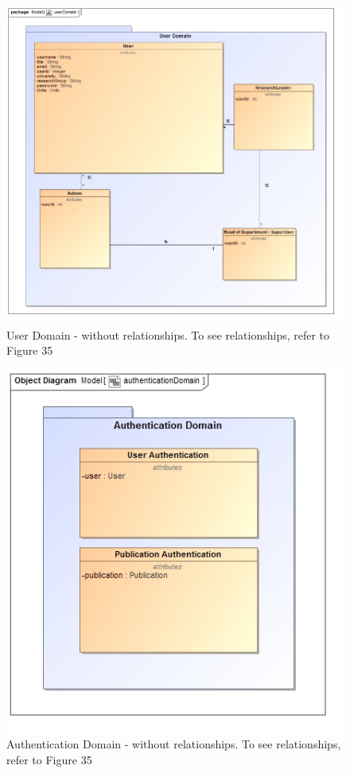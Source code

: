 \documentclass{article}
\begin{document}
			\begin{figure}[H]				
				\includegraphics[width=\linewidth]{../Diagrams/Domain Model/userDomain.jpg}
				\caption{ User Domain - without relationships. To see relationships, refer to Figure 35 }
			\end{figure}
			
			\begin{figure}[H]				
				\includegraphics[width=\linewidth]{../Diagrams/Domain Model/authenticationDomain.jpg}
				\caption{ Authentication Domain - without relationships. To see relationships, refer to Figure 35}
			\end{figure}
			
\end{document}
